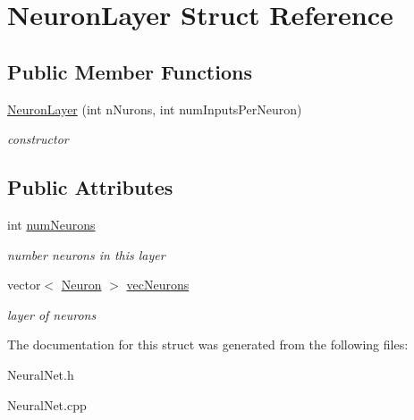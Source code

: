 \hypertarget{struct_neuron_layer}{}\section{Neuron\+Layer Struct Reference}
\label{struct_neuron_layer}
\subsection*{Public Member Functions}
\begin{DoxyCompactItemize}
\item 
\hypertarget{struct_neuron_layer_abd4e017ef1311a09eb0b840e5ebb9c7f}{}\label{struct_neuron_layer_abd4e017ef1311a09eb0b840e5ebb9c7f} 
\hyperlink{struct_neuron_layer_abd4e017ef1311a09eb0b840e5ebb9c7f}{Neuron\+Layer} (int n\+Nurons, int num\+Inputs\+Per\+Neuron)
\begin{DoxyCompactList}\small\item\em constructor \end{DoxyCompactList}\end{DoxyCompactItemize}
\subsection*{Public Attributes}
\begin{DoxyCompactItemize}
\item 
\hypertarget{struct_neuron_layer_a0c1340701dbd67d945f65f68e4e93f9e}{}\label{struct_neuron_layer_a0c1340701dbd67d945f65f68e4e93f9e} 
int \hyperlink{struct_neuron_layer_a0c1340701dbd67d945f65f68e4e93f9e}{num\+Neurons}
\begin{DoxyCompactList}\small\item\em number neurons in this layer \end{DoxyCompactList}\item 
\hypertarget{struct_neuron_layer_aa1dd1b1359dc7ae424f336357db233cd}{}\label{struct_neuron_layer_aa1dd1b1359dc7ae424f336357db233cd} 
vector$<$ \hyperlink{struct_neuron}{Neuron} $>$ \hyperlink{struct_neuron_layer_aa1dd1b1359dc7ae424f336357db233cd}{vec\+Neurons}
\begin{DoxyCompactList}\small\item\em layer of neurons \end{DoxyCompactList}\end{DoxyCompactItemize}


The documentation for this struct was generated from the following files\+:\begin{DoxyCompactItemize}
\item 
Neural\+Net.\+h\item 
Neural\+Net.\+cpp\end{DoxyCompactItemize}
